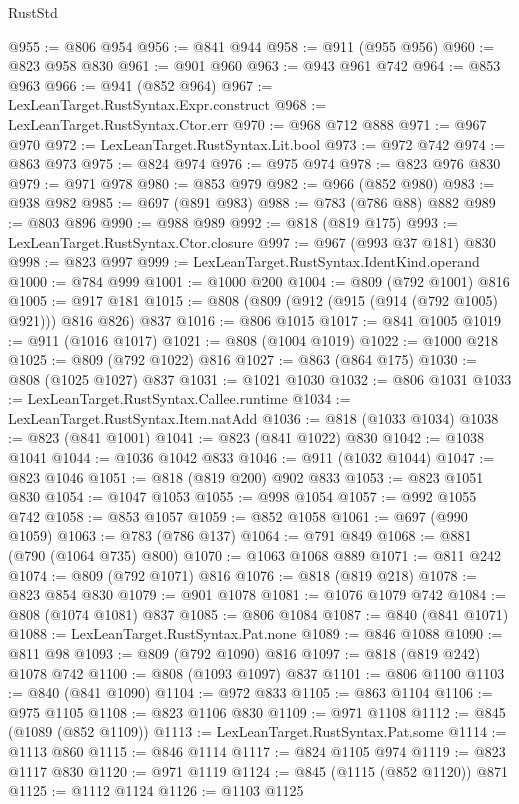 \begin{lexlean}{RustStd}
\begin{coremodule}
@955 := @806 @954
@956 := @841 @944
@958 := @911 (@955 @956)
@960 := @823 @958 @830
@961 := @901 @960
@963 := @943 @961 @742
@964 := @853 @963
@966 := @941 (@852 @964)
@967 := LexLeanTarget.RustSyntax.Expr.construct
@968 := LexLeanTarget.RustSyntax.Ctor.err
@970 := @968 @712 @888
@971 := @967 @970
@972 := LexLeanTarget.RustSyntax.Lit.bool
@973 := @972 @742
@974 := @863 @973
@975 := @824 @974
@976 := @975 @974
@978 := @823 @976 @830
@979 := @971 @978
@980 := @853 @979
@982 := @966 (@852 @980)
@983 := @938 @982
@985 := @697 (@891 @983)
@988 := @783 (@786 @88) @882
@989 := @803 @896
@990 := @988 @989
@992 := @818 (@819 @175)
@993 := LexLeanTarget.RustSyntax.Ctor.closure
@997 := @967 (@993 @37 @181) @830
@998 := @823 @997
@999 := LexLeanTarget.RustSyntax.IdentKind.operand
@1000 := @784 @999
@1001 := @1000 @200
@1004 := @809 (@792 @1001) @816
@1005 := @917 @181
@1015 := @808 (@809 (@912 (@915 (@914 (@792 @1005) @921))) @816 @826) @837
@1016 := @806 @1015
@1017 := @841 @1005
@1019 := @911 (@1016 @1017)
@1021 := @808 (@1004 @1019)
@1022 := @1000 @218
@1025 := @809 (@792 @1022) @816
@1027 := @863 (@864 @175)
@1030 := @808 (@1025 @1027) @837
@1031 := @1021 @1030
@1032 := @806 @1031
@1033 := LexLeanTarget.RustSyntax.Callee.runtime
@1034 := LexLeanTarget.RustSyntax.Item.natAdd
@1036 := @818 (@1033 @1034)
@1038 := @823 (@841 @1001)
@1041 := @823 (@841 @1022) @830
@1042 := @1038 @1041
@1044 := @1036 @1042 @833
@1046 := @911 (@1032 @1044)
@1047 := @823 @1046
@1051 := @818 (@819 @200) @902 @833
@1053 := @823 @1051 @830
@1054 := @1047 @1053
@1055 := @998 @1054
@1057 := @992 @1055 @742
@1058 := @853 @1057
@1059 := @852 @1058
@1061 := @697 (@990 @1059)
@1063 := @783 (@786 @137)
@1064 := @791 @849
@1068 := @881 (@790 (@1064 @735) @800)
@1070 := @1063 @1068 @889
@1071 := @811 @242
@1074 := @809 (@792 @1071) @816
@1076 := @818 (@819 @218)
@1078 := @823 @854 @830
@1079 := @901 @1078
@1081 := @1076 @1079 @742
@1084 := @808 (@1074 @1081) @837
@1085 := @806 @1084
@1087 := @840 (@841 @1071)
@1088 := LexLeanTarget.RustSyntax.Pat.none
@1089 := @846 @1088
@1090 := @811 @98
@1093 := @809 (@792 @1090) @816
@1097 := @818 (@819 @242) @1078 @742
@1100 := @808 (@1093 @1097) @837
@1101 := @806 @1100
@1103 := @840 (@841 @1090)
@1104 := @972 @833
@1105 := @863 @1104
@1106 := @975 @1105
@1108 := @823 @1106 @830
@1109 := @971 @1108
@1112 := @845 (@1089 (@852 @1109))
@1113 := LexLeanTarget.RustSyntax.Pat.some
@1114 := @1113 @860
@1115 := @846 @1114
@1117 := @824 @1105 @974
@1119 := @823 @1117 @830
@1120 := @971 @1119
@1124 := @845 (@1115 (@852 @1120)) @871
@1125 := @1112 @1124
@1126 := @1103 @1125

\end{coremodule}
\end{lexlean}
